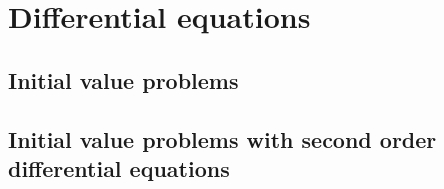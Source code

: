 \chapter{Differential equations}
\section{Initial value problems}

\section{Initial value problems with second order differential equations}
